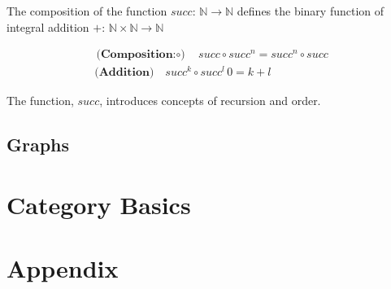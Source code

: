 \documentclass[aps,twocolumn,secnumarabic,nobalancelastpage,amsmath,amssymb,
amsthm,nofootinbib,parskip=full]{revtex4}
\numberwithin{equation}{section}
\begin{document}
The composition of the function $succ:\,\mathbb{N}\rightarrow\mathbb{N}$
defines the binary function of integral addition
$+:\,\mathbb{N}\times\mathbb{N}\rightarrow\mathbb{N}$

\begin{align}
  \textbf{(Composition:$\circ$)}\quad succ\circ succ^n=succ^n\circ succ\label{eq:comp}\\
  \textbf{(Addition)}\quad succ^k\circ succ^l\,0=k+l\label{eq:add}
\end{align}

The function,  $succ$, introduces concepts of recursion
and order.


\subsection{Graphs}



\section{Category Basics}

\section{Appendix}


\end{document}
